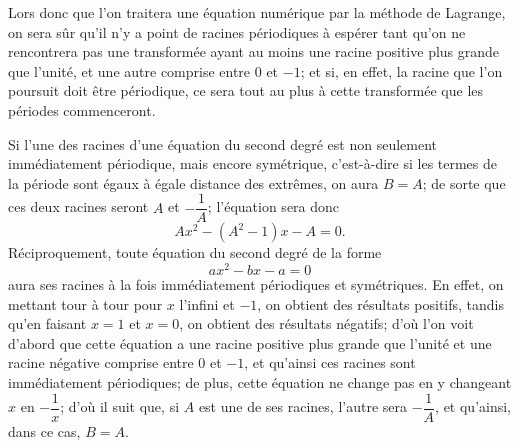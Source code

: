 \documentclass[leqno,12pt]{book}[2005/09/16]
\begin{document}
Lors donc que l'on traitera une équation numérique par la méthode
de Lagrange, on sera sûr qu'il n'y a point de racines périodiques
à espérer tant qu'on ne rencontrera pas une transformée
ayant au moins une racine positive plus grande que l'unité, et une
autre comprise entre 0 et $-1$; et si, en effet, la racine que l'on
poursuit doit être périodique, ce sera tout au plus à cette transformée
que les périodes commenceront.

Si l'une des racines d'une équation du second degré est non
seulement immédiatement périodique, mais encore symétrique,
c'est-à-dire si les termes de la période sont égaux à égale distance
des extrêmes, on aura $B = A$; de sorte que ces deux racines
seront $A$ et $-\dfrac{1}{A}$; l'équation sera donc
\[
Ax^{2} - (A^{2}-1)x - A = 0.
\]
Réciproquement, toute équation du second degré de la forme
\[
ax^{2} - bx - a = 0
\]
aura ses racines à la fois immédiatement périodiques et symétriques.
En effet, on mettant tour à tour pour $x$ l'infini et $-1$, on
obtient des résultats positifs, tandis qu'en faisant $x=1$ et $x=0$,
on obtient des résultats négatifs; d'où l'on voit d'abord que cette
équation a une racine positive plus grande que l'unité et une racine
négative comprise entre $0$ et $-1$, et qu'ainsi ces racines sont
immédiatement périodiques; de plus, cette équation ne change
pas en y changeant $x$ en $-\dfrac{1}{x}$; d'où il suit que, si $A$ est une de ses
racines, l'autre sera $-\dfrac{1}{A}$, et qu'ainsi, dans ce cas, $B=A$.
\end{document}
